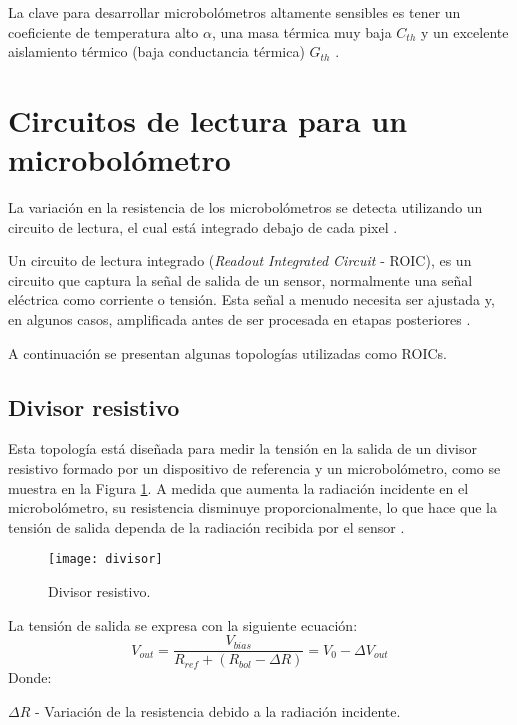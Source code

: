         
La clave para desarrollar microbolómetros altamente sensibles es tener un coeficiente de temperatura alto $\alpha$, una masa térmica muy baja $C_{th}$ y un excelente aislamiento térmico (baja conductancia térmica) $G_{th}$ \cite{Rogalski}.

\section{Circuitos de lectura para un microbolómetro}
La variación en la resistencia de los microbolómetros se detecta utilizando un circuito de lectura, el cual está integrado debajo de cada pixel \cite{Budzier}.


Un circuito de lectura integrado (\textit{Readout Integrated Circuit} - ROIC), es un circuito que captura la señal de salida de un sensor, normalmente una señal eléctrica como corriente o tensión. Esta señal a menudo necesita ser ajustada y, en algunos casos, amplificada antes de ser procesada en etapas posteriores \cite{BlancoMDA}.


A continuación se presentan algunas topologías utilizadas como ROICs.

\subsection{Divisor resistivo} 
Esta topología está diseñada para medir la tensión en la salida de un divisor resistivo formado por un dispositivo de referencia y un microbolómetro, como se muestra en la Figura \ref{fig:divisor}. A medida que aumenta la radiación incidente en el microbolómetro, su resistencia disminuye proporcionalmente, lo que hace que la tensión de salida dependa de la radiación recibida por el sensor \cite{BlancoMDA}.
            \begin{figure}[hbtp]
                \centering
                \texttt{[image: divisor]}
                \caption{Divisor resistivo.}
                \label{fig:divisor}
            \end{figure}

La tensión de salida se expresa con la siguiente ecuación:
        \begin{equation}
        V_{out} =\frac{V_{bias}}{R_{ref} + (R_{bol} - \Delta R)} = V_{0} - \Delta V_{out}
        \label{eq:Divisor}
        \end{equation} 
Donde:


$\Delta R$ - Variación de la resistencia debido a la radiación incidente.


